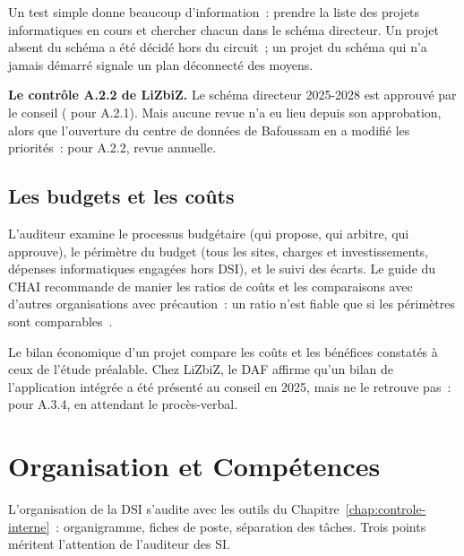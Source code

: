 Un test simple donne beaucoup d'information~: prendre la liste des projets
informatiques en cours et chercher chacun dans le schéma directeur. Un
projet absent du schéma a été décidé hors du circuit~; un projet du
schéma qui n'a jamais démarré signale un plan déconnecté des moyens.

\begin{boxinfo}
\textbf{Le contrôle A.2.2 de LiZbiZ.} Le schéma directeur 2025-2028 est
approuvé par le conseil (\OUI{} pour A.2.1). Mais aucune revue n'a eu
lieu depuis son approbation, alors que l'ouverture du centre de données de
Bafoussam en a modifié les priorités~: \NON{} pour A.2.2, revue annuelle.
\end{boxinfo}

\subsection{Les budgets et les coûts}

L'auditeur examine le processus budgétaire (qui propose, qui arbitre, qui
approuve), le périmètre du budget (tous les sites, charges et
investissements, dépenses informatiques engagées hors DSI), et le suivi
des écarts. Le guide du CHAI recommande de manier les ratios de coûts et
les comparaisons avec d'autres organisations avec précaution~: un ratio
n'est fiable que si les périmètres sont comparables~\cite{chai2014guide}.

Le bilan économique d'un projet compare les coûts et les bénéfices
constatés à ceux de l'étude préalable. Chez LiZbiZ, le DAF affirme qu'un
bilan de l'application intégrée a été présenté au conseil en 2025, mais
ne le retrouve pas~: \NEK{} pour A.3.4, en attendant le procès-verbal.

\section{Organisation et Compétences}
\label{sec:c13-organisation}

L'organisation de la DSI s'audite avec les outils du
Chapitre~\ref{chap:controle-interne}~: organigramme, fiches de poste,
séparation des tâches. Trois points méritent l'attention de l'auditeur
des SI.

